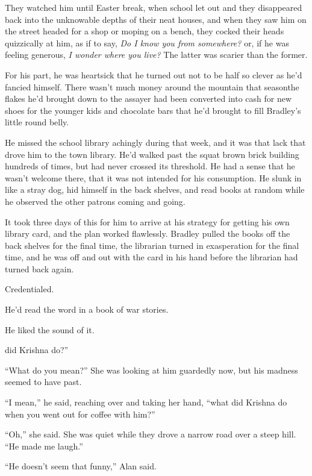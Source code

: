 They watched him until Easter break, when school let out and they
disappeared back into the unknowable depths of their neat houses, and
when they saw him on the street headed for a shop or moping on a
bench, they cocked their heads quizzically at him, as if to say,
\textit{Do I know you from somewhere?} or, if he was feeling generous,
\textit{I wonder where you live?} The latter was scarier than the
former.

For his part, he was heartsick that he turned out not to be half so
clever as he'd fancied himself.  There wasn't much money around the
mountain that season\dash{}the flakes he'd brought down to the assayer had
been converted into cash for new shoes for the younger kids and
chocolate bars that he'd brought to fill Bradley's little round belly.

He missed the school library achingly during that week, and it was
that lack that drove him to the town library.  He'd walked past the
squat brown brick building hundreds of times, but had never crossed
its threshold.  He had a sense that he wasn't welcome there, that it
was not intended for his consumption.  He slunk in like a stray dog,
hid himself in the back shelves, and read books at random while he
observed the other patrons coming and going.

It took three days of this for him to arrive at his strategy for
getting his own library card, and the plan worked flawlessly.  Bradley
pulled the books off the back shelves for the final time, the
librarian turned in exasperation for the final time, and he was off
and out with the card in his hand before the librarian had turned back
again.

Credentialed.

He'd read the word in a book of war stories.

He liked the sound of it.

did Krishna do?''

``What do you mean?'' She was looking at him guardedly now, but his
madness seemed to have past.

``I mean,'' he said, reaching over and taking her hand, ``what did
Krishna do when you went out for coffee with him?''

``Oh,'' she said.  She was quiet while they drove a narrow road over a
steep hill.  ``He made me laugh.''

``He doesn't seem that funny,'' Alan said.

